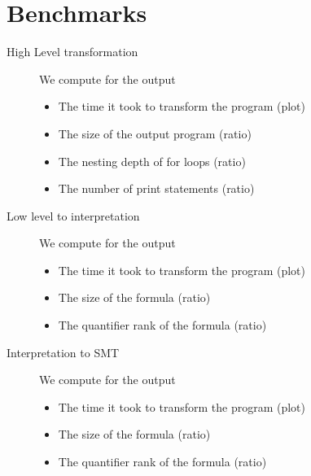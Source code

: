 \section{Benchmarks}
\label{sec:benchmarks}

\begin{description}
    \item[High Level transformation]
        We compute for the output
        \begin{itemize}
            \item The time it took to transform the program (plot)
            \item The size of the output program (ratio)
            \item The nesting depth of for loops (ratio)
            \item The number of print statements (ratio)
        \end{itemize}
    \item[Low level to interpretation]
        We compute for the output
        \begin{itemize}
            \item The time it took to transform the program (plot)
            \item The size of the formula (ratio)
            \item The quantifier rank of the formula (ratio)
        \end{itemize}
    \item[Interpretation to SMT]
        We compute for the output
        \begin{itemize}
            \item The time it took to transform the program (plot)
            \item The size of the formula (ratio)
            \item The quantifier rank of the formula (ratio)
        \end{itemize}
\end{description}

